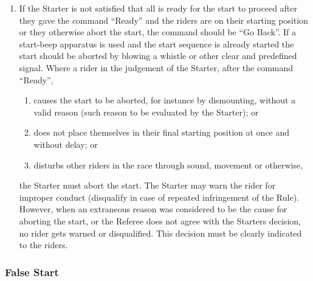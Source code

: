 \begin{enumerate}[leftmargin=1.5em,labelsep=*]
\begin{enumerate}[label*=\arabic*,leftmargin=1.5em,labelsep=*]
	 	The final tone (buup) has a higher frequency, so that the competitors can easily distinguish this tone from the rest.
	 	The proper moment to start is the beginning of the final tone.
	 	\item As an alternative, the Starter will give a three-count start before firing a starting gun on the fourth count.
	 	Example: ``One, two, three, BANG!''.
	 	The time between (the start of) each of these elements must be the same, and should approximately 1 second.
	 \end{enumerate}
	 Both variants allow the rider to start leaning ahead of the “buup/BANG”, for an exact and predictable start.
	 It is recommended to use one or the other of those two options for all races in a competition if possible.
	 The option to be used must be announced in advance of the competition.
	 \item If the Starter is not satisfied that all is ready for the start to proceed after they gave the command ``Ready'' and the riders are on their starting position or they otherwise abort the start, the command should be ``Go Back''.
	 If a start-beep apparatus is used and the start sequence is already started the start should be aborted by blowing a whistle or other clear and predefined signal.
	 Where a rider in the judgement of the Starter, after the command ``Ready'',
	 \begin{enumerate}[label*=\arabic*,leftmargin=1.5em,labelsep=*]
	 	\item causes the start to be aborted, for instance by dismounting, without a valid reason (such reason to be evaluated by the Starter); or
	 	\item does not place themselves in their final starting position at once and without delay; or
	 	\item disturbs other riders in the race through sound, movement or otherwise,
	 \end{enumerate}
	 the Starter must abort the start.
	 The Starter may warn the rider for improper conduct (disqualify in case of repeated infringement of the Rule).
	 However, when an extraneous reason was considered to be the cause for aborting the start, or the Referee does not agree with the Starters decision, 
     no rider gets warned or disqualified.
	 This decision must be clearly indicated to the riders.
\end{enumerate}

\subsubsection{False Start}

